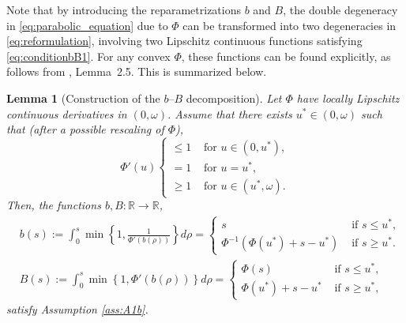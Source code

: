 \documentclass[review,11pt]{article}
\numberwithin{equation}{section}
\def \vs  {\omega}
\newtheorem{lemma}{Lemma}[section]
\newcounter{Ass}
\begin{document}
\noindent
Note that by introducing the reparametrizations $b$ and $B$, the double degeneracy in \eqref{eq:parabolic_equation} due to $\Phi$ can be transformed into two degeneracies in \eqref{eq:reformulation}, involving two Lipschitz continuous functions satisfying \eqref{eq:conditionbB1}. For any convex $\Phi$, these functions can be found explicitly, as follows from  \cite{javed2025robust}, Lemma~2.5. This is summarized below.






\begin{lemma}[Construction of the $b$--$B$ decomposition]\label{lemma:b_B_construction}Let 
$\Phi$ have locally Lipschitz continuous derivatives in $(0,\vs)$. Assume that there exists $u^*\in (0,\vs)$ such that (after a possible rescaling of $\Phi$),\label{ass:Bphi}
\begin{equation*}
    \Phi'(u)\begin{cases}
        \leq 1 &\text{ for } u\in (0,u^*),\\
        =1&\text{ for } u=u^*,\\
        \geq 1 &\text{ for } u\in (u^*,\vs).
    \end{cases}
\end{equation*}    
Then, the functions $b, B : \mathbb{R} \to \mathbb{R}$,
\begin{subequations}\label{eq:bBexpression}
    \begin{align}
            &b(s):=\int_0^s \min\left\{1, \frac{1}{\Phi'(b(\rho))}\right\}d\rho=\begin{cases}
             s &\text{ if } s\leq u^*,\\
             \Phi^{-1}(\Phi(u^*) + s-u^*) &\text{ if } s\geq u^*.
         \end{cases}\\
         &B(s):=\int_0^s \min \left\{1, \Phi'(b(\rho))\right\}d\rho=\begin{cases}
             \Phi(s) &\text{ if } s\leq u^*,\\
             \Phi(u^*) + s-u^*&\text{ if } s\geq u^*,
         \end{cases}
    \end{align}   
\end{subequations}
satisfy Assumption \ref{ass:A1b}.

\end{lemma}
\end{document}
